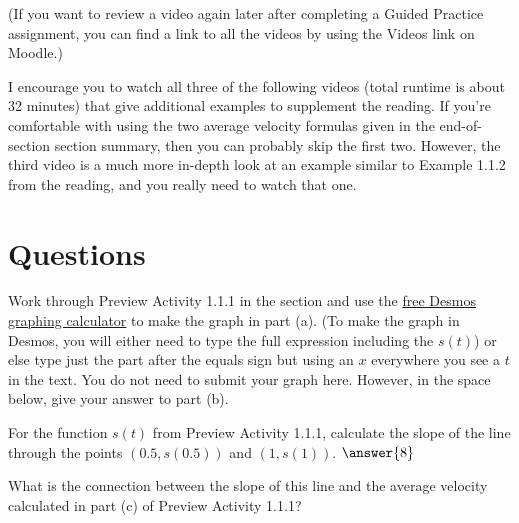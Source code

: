 \documentclass{ximera}
\begin{document}
(If you want to review a video again later after completing a Guided
Practice assignment, you can find a link to all the videos by using
the Videos link on Moodle.)

I encourage you to watch all three of the following videos (total
runtime is about 32 minutes) that give additional examples to
supplement the reading. If you're comfortable with using the two
average velocity formulas given in the end-of-section section summary, then
you can probably skip the first two. However, the third video is a
much more in-depth look at an example similar to Example 1.1.2 from the
reading, and you really need to watch that one.


\section*{Questions}

\begin{exercise}
  Work through Preview Activity 1.1.1 in the section and use the
  \href{http://www.desmos.com}{free Desmos graphing calculator} to
  make the graph in part (a). (To make the graph in Desmos, you will
  either need to type the full expression including the $s(t)$) or
  else type just the part after the equals sign but using an $x$
  everywhere you see a $t$ in the text. You do not need to submit your
  graph here. However, in the space below, give your answer to part
  (b).

  \begin{freeResponse}
  
  \end{freeResponse}
\end{exercise}
\begin{exercise}
  For the function $s(t)$ from Preview Activity 1.1.1, calculate the
  slope of the line through the points $(0.5,s(0.5))$ and
  $(1,s(1))$. $\answer{8}$
\end{exercise}

\begin{exercise}  
What is the connection between the slope of this line and the average velocity calculated in part (c) of Preview Activity 1.1.1?
  \begin{multipleChoice}  
  \end{multipleChoice}  
\end{exercise}
\end{document}
